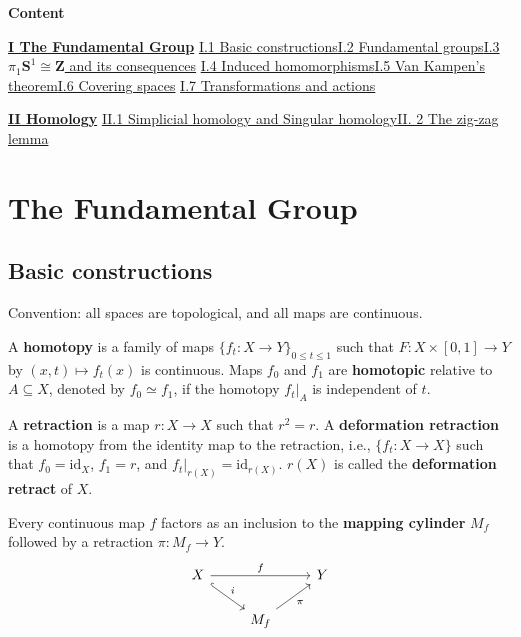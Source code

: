 \documentclass[11pt]{article}
\newcommand{\forceindent}{\leavevmode{\parindent=1.5em\indent}}
\theoremstyle{definition}
\theoremstyle{plain}
\theoremstyle{remark}
\newcommand{\id}{\textrm{id}}
\newcommand{\Z}{\mathbf{Z}}
\begin{document}
\textbf{\Large{Content}}\bigbreak

\hyperref[1]{\textbf{I The Fundamental Group}}\newline
\forceindent\hyperref[2]{I.1 Basic constructions}\quad\hyperref[3]{I.2 Fundamental groups}\quad\hyperref[4]{I.3 $\pi_1\mathbf{S}^1\cong\Z$ and its consequences}\newline
\forceindent\hyperref[6]{I.4 Induced homomorphisms}\quad\hyperref[7]{I.5 Van Kampen's theorem}\quad\hyperref[8]{I.6 Covering spaces}\newline
\forceindent\hyperref[9]{I.7 Transformations and actions}\medbreak

\hyperref[10]{\textbf{II Homology}}\newline
\forceindent\hyperref[11]{II.1 Simplicial homology and Singular homology}\quad\hyperref[12]{II. 2 The zig-zag lemma}

\newpage
\section{The Fundamental Group}\label{1}

\subsection{Basic constructions}\label{2}

Convention: all spaces are topological, and all maps are continuous.\medbreak

A \textbf{homotopy} is a family of maps $\{f_t:X\to Y\}_{0\leq t\leq1}$ such that $F:X\times[0,1]\to Y$ by $(x,t)\mapsto f_t(x)$ is continuous. Maps $f_0$ and $f_1$ are \textbf{homotopic} relative to $A\subseteq X$, denoted by $f_0\simeq f_1$, if the homotopy $f_t|_A$ is independent of $t$.\medbreak

A \textbf{retraction} is a map $r:X\to X$ such that $r^2=r$. A \textbf{deformation retraction} is a homotopy from the identity map to the retraction, i.e., $\{f_t:X\to X\}$ such that $f_0=\id_X$, $f_1=r$, and $f_t|_{r(X)}=\id_{r(X)}$. $r(X)$ is called the \textbf{deformation retract} of $X$.\medbreak

Every continuous map $f$ factors as an inclusion to the \textbf{mapping cylinder} $M_f$ followed by a retraction $\pi:M_f\to Y$.
\[\begin{tikzcd}
X\arrow[hookrightarrow]{dr}{i}\arrow{rr}{f}&&Y\\
&M_f\arrow[swap]{ur}{\pi}
\end{tikzcd}\]\medbreak
\end{document}
